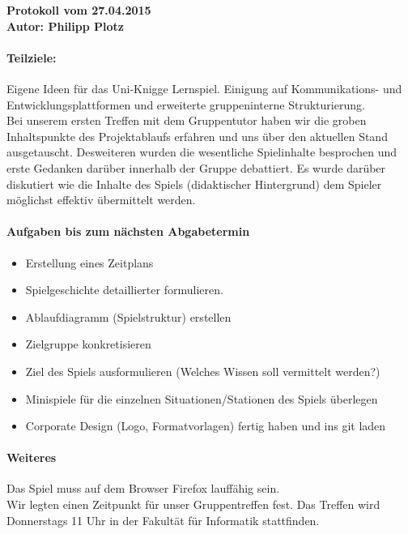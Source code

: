 \documentclass[a4paper,10pt]{article}
\begin{document}
{\bfseries \large Protokoll vom 27.04.2015 \\[1mm]		%
\normalfont Autor: Philipp Plotz}					%

\paragraph{Teilziele:}								%
Eigene Ideen für das Uni-Knigge Lernspiel.
Einigung auf Kommunikations- und Entwicklungsplattformen und erweiterte gruppeninterne Strukturierung.\\


Bei unserem ersten Treffen mit dem Gruppentutor haben wir die groben Inhaltspunkte des Projektablaufs erfahren und uns über den aktuellen Stand ausgetauscht. Desweiteren wurden die wesentliche Spielinhalte besprochen und erste Gedanken darüber innerhalb der Gruppe debattiert. Es wurde darüber diskutiert wie die Inhalte des Spiels (didaktischer Hintergrund) dem Spieler möglichst effektiv übermittelt werden.

\paragraph{Aufgaben bis zum nächsten Abgabetermin} 
\begin{itemize}
	\item Erstellung eines Zeitplans
	\item Spielgeschichte detaillierter formulieren.
	\item Ablaufdiagramm (Spielstruktur) erstellen
	\item Zielgruppe konkretisieren
	\item Ziel des Spiels ausformulieren (Welches Wissen soll vermittelt werden?)
	\item Minispiele für die einzelnen Situationen/Stationen des Spiels überlegen
	\item Corporate Design (Logo, Formatvorlagen) fertig haben und ins git laden
\end{itemize}

\paragraph{Weiteres}
Das Spiel muss auf dem Browser Firefox lauffähig sein. \\
Wir legten einen Zeitpunkt für unser Gruppentreffen fest. Das Treffen wird Donnerstags 11 Uhr in der Fakultät für Informatik stattfinden.
\end{document}
